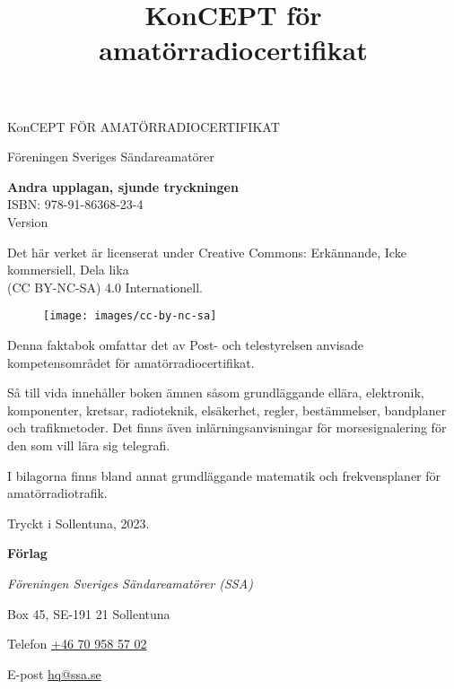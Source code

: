 \onecolumn{}
\vspace{10em}
\title{KonCEPT för amatörradiocertifikat}
\begin{center}
\Large{KonCEPT FÖR AMATÖRRADIOCERTIFIKAT}

Föreningen Sveriges Sändareamatörer\\[2\baselineskip]
\end{center}

\noindent \textbf{Andra upplagan, sjunde tryckningen}\\
\noindent ISBN: 978-91-86368-23-4\\
\noindent Version \revision
\bigskip

\noindent Det här verket är licenserat under Creative Commons:\newline
\noindent Erkännande, Icke kommersiell, Dela lika\\
\noindent (CC BY-NC-SA) 4.0 Internationell.
\begin{figure}[h]
    \texttt{[image: images/cc-by-nc-sa]}
\end{figure}

\vfill

\noindent Denna faktabok omfattar det av Post- och tele\-styrel\-sen anvisade
kompetensområdet för amatörradiocertifikat.

\bigskip

\noindent Så till vida innehåller boken ämnen såsom grundläggande ellära, elektronik, komponenter,
kretsar, radioteknik, elsäkerhet, regler, bestämmelser, bandplaner och tra\-fik\-metoder.
Det finns även inlärningsanvisningar för morsesignalering för den
som vill lära sig telegrafi.

\bigskip

\noindent I bilagorna finns bland annat grundläggande matematik
och frekvensplaner för ama\-törradiotrafik. 

\vfill

\noindent Tryckt i Sollentuna, 2023.

\bigskip

\noindent \textbf{Förlag}

\smallskip

\noindent\textit{Föreningen Sveriges Sändareamatörer (SSA)}

\smallskip\noindent Box 45, SE-191 21 Sollentuna

\smallskip\noindent Telefon \href{tel:+46709585702}{+46 70 958 57 02}

\smallskip\noindent E-post \href{mailto:hq@ssa.se}{hq@ssa.se}

\restoregeometry\twocolumn
{}
